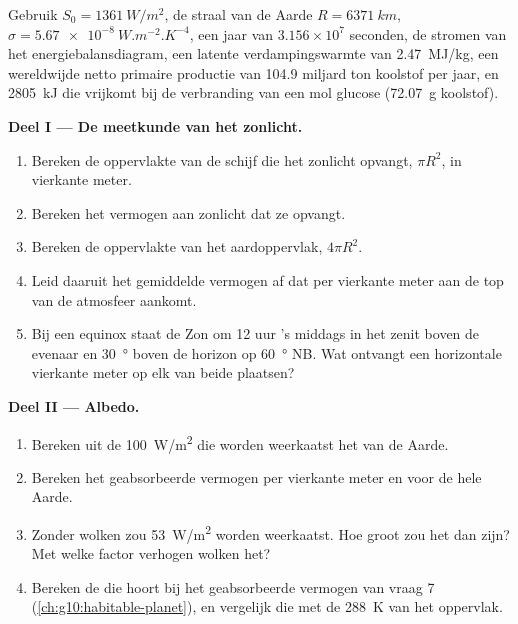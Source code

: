 \begin{problem}
\label{pb:g10:earth-energy-budget:1}
Gebruik $S_0 = \qty{1361}{W/m^2}$, de straal van de Aarde $R = \qty{6371}{km}$,
$\sigma = \qty{5.67e-8}{W.m^{-2}.K^{-4}}$, een jaar van $3.156\times10^7$
seconden, de stromen van het energiebalansdiagram, een latente
verdampingswarmte van \qty{2.47}{MJ/kg}, een wereldwijde netto primaire productie
van \num{104.9} miljard ton koolstof per jaar, en \qty{2805}{kJ} die vrijkomt
bij de verbranding van een mol glucose (\qty{72.07}{g} koolstof).

\medskip
\noindent\textbf{Deel I --- De meetkunde van het zonlicht.}
\begin{enumerate}
  \item Bereken de oppervlakte van de schijf die het zonlicht opvangt, $\pi R^2$,
        in vierkante meter.
  \item Bereken het vermogen aan zonlicht dat ze opvangt.
  \item Bereken de oppervlakte van het aardoppervlak, $4\pi R^2$.
  \item Leid daaruit het gemiddelde vermogen af dat per vierkante meter aan de
        top van de atmosfeer aankomt.
  \item Bij een equinox staat de Zon om 12 uur 's middags in het zenit boven de
        evenaar en \qty{30}{\degree} boven de horizon op \qty{60}{\degree} NB. Wat
        ontvangt een horizontale vierkante meter op elk van beide plaatsen?
\end{enumerate}

\medskip
\noindent\textbf{Deel II --- Albedo.}
\begin{enumerate}[resume]
  \item Bereken uit de \qty{100}{W/m^2} die worden weerkaatst het  van de Aarde.
  \item Bereken het geabsorbeerde vermogen per vierkante meter en voor de hele Aarde.
  \item Zonder wolken zou \qty{53}{W/m^2} worden weerkaatst. Hoe groot zou het
         dan zijn? Met welke factor verhogen wolken het?
  \item Bereken de  die hoort bij het geabsorbeerde
        vermogen van vraag 7 (\cref{ch:g10:habitable-planet}), en vergelijk die
        met de \qty{288}{K} van het oppervlak.
\end{enumerate}


\end{problem}
